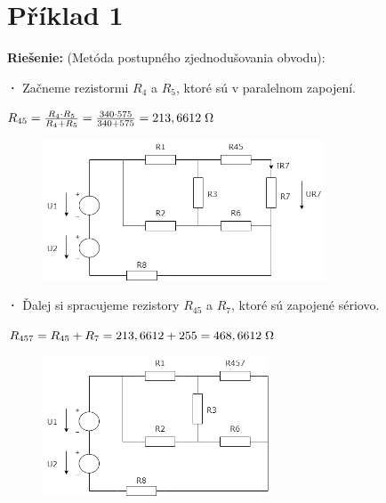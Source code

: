\section{Příklad 1}

\begin{large}
\textbf{Riešenie:} (Metóda postupného zjednodušovania obvodu):\\
\end{large}

\textbf{·}
Začneme rezistormi $R_4$ a $R_5$, ktoré sú v paralelnom zapojení.

\begin{center}
$R_{45} = \frac{R_4\cdot{R_5}}{R_4 + R_5} = \frac{340\cdot 575}{340 + 575} = {213,6612} \hspace{0,1cm} \SI{}{\ohm}$\\
\end{center}

\begin{figure}[h!]
    \centering
    \includegraphics[width=0.75\textwidth]{IEL-Project/pictures/Pr1_1.png}
\end{figure}

\textbf{·}
Ďalej si spracujeme rezistory $R_{45}$ a $R_7$, ktoré sú zapojené sériovo.

\begin{center}
$R_{457} = R_{45} + R_7 = 213,6612 + 255 = 468,6612 \hspace{0,1cm} \SI{}{\ohm}$\\
\end{center}

\begin{figure}[h!]
    \centering
    \includegraphics[width=0.6\textwidth]{IEL-Project/pictures/Pr1_2.png}
\end{figure}

